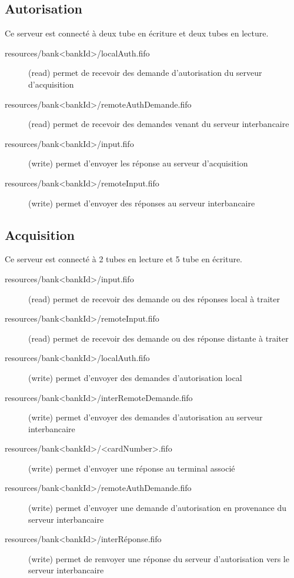 \documentclass[french, a4paper, 12pt, titlepage]{article}
\begin{document}
\subsection{Autorisation}
Ce serveur est connecté à deux tube en écriture et deux tubes en lecture.
\begin{description}
	\item[resources/bank<bankId>/localAuth.fifo] (read) permet de recevoir des demande d'autorisation du serveur d'acquisition
	\item[resources/bank<bankId>/remoteAuthDemande.fifo] (read) permet de recevoir des demandes venant du serveur interbancaire
	\item[resources/bank<bankId>/input.fifo] (write) permet d'envoyer les réponse au serveur d'acquisition
	\item[resources/bank<bankId>/remoteInput.fifo] (write) permet d'envoyer des réponses au serveur interbancaire
\end{description}

\subsection{Acquisition}
Ce serveur est connecté à 2 tubes en lecture et 5 tube en écriture.
\begin{description}
	\item[resources/bank<bankId>/input.fifo] (read) permet de recevoir des demande ou des réponses local à traiter
	\item[resources/bank<bankId>/remoteInput.fifo] (read) permet de recevoir des demande ou des réponse distante à traiter
	\item[resources/bank<bankId>/localAuth.fifo] (write) permet d'envoyer des demandes d'autorisation local
	\item[resources/bank<bankId>/interRemoteDemande.fifo] (write) permet d'envoyer des demandes d'autorisation au serveur interbancaire
	\item[resources/bank<bankId>/<cardNumber>.fifo] (write) permet d'envoyer une réponse au terminal associé
	\item[resources/bank<bankId>/remoteAuthDemande.fifo] (write) permet d'envoyer une demande d'autorisation en provenance du serveur interbancaire
	\item[resources/bank<bankId>/interRéponse.fifo] (write) permet de renvoyer une réponse du serveur d'autorisation vers le serveur interbancaire
\end{description}
\end{document}
